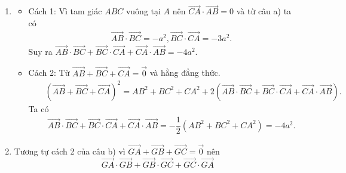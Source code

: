 \begin{bt}
{\begin{enumerate}
{	
			}
		\begin{itemize}
			\item[] Theo định lý Pitago ta có $CA=\sqrt{(2a)^2-a^2}=a\sqrt{3}$. \\
			Suy ra $\overrightarrow{BC}\cdot\overrightarrow{CA}=-a\sqrt{3}\cdot 2a\cdot\dfrac{a\sqrt{3}}{2a}=-3a^2$.
		\end{itemize}
		
			\item 
			\begin{itemize}
				\item Cách 1: Vì tam giác $ABC$ vuông tại $A$ nên $\overrightarrow{CA}\cdot\overrightarrow{AB}=0$ và từ câu a) ta có
				\begin{eqnarray*}
					&&\overrightarrow{AB}\cdot\overrightarrow{BC}=-a^2,\overrightarrow{BC}\cdot\overrightarrow{CA}=-3a^2.
				\end{eqnarray*} 
				Suy ra $\overrightarrow{AB}\cdot\overrightarrow{BC}+\overrightarrow{BC}\cdot\overrightarrow{CA}+\overrightarrow{CA}\cdot\overrightarrow{AB}=-4a^2$.
				\item Cách 2: Từ $\overrightarrow{AB}+\overrightarrow{BC}+\overrightarrow{CA}=\overrightarrow{0}$ và hằng đẳng thức.
				\begin{eqnarray*}
					&&\left(\overrightarrow{AB}+\overrightarrow{BC}+\overrightarrow{CA}\right)^2=AB^2+BC^2+CA^2+2\left(\overrightarrow{AB}\cdot\overrightarrow{BC}+\overrightarrow{BC}\cdot\overrightarrow{CA}+\overrightarrow{CA}\cdot\overrightarrow{AB}\right).
				\end{eqnarray*}
				Ta có
				\begin{eqnarray*}
					&&\overrightarrow{AB}\cdot\overrightarrow{BC}+\overrightarrow{BC}\cdot\overrightarrow{CA}+\overrightarrow{CA}\cdot\overrightarrow{AB}=-\dfrac{1}{2}\left(AB^2+BC^2+CA^2\right)=-4a^2.
				\end{eqnarray*} 
			\end{itemize}
			\item Tương tự cách 2 của câu b) vì $\overrightarrow{GA}+\overrightarrow{GB}+\overrightarrow{GC}=\overrightarrow{0}$ nên
			$$\overrightarrow{GA}\cdot\overrightarrow{GB}+\overrightarrow{GB}\cdot\overrightarrow{GC}+\overrightarrow{GC}\cdot\overrightarrow{GA}
$$
\end{enumerate}}
\end{bt}
